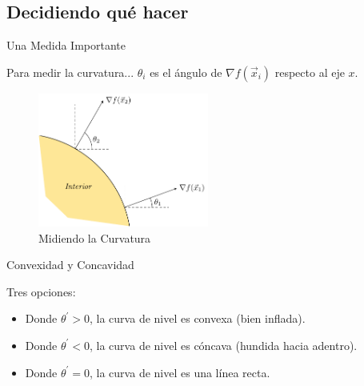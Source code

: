 \documentclass[fleqn]{beamer}\usepackage[]{graphicx}\usepackage[]{xcolor}
\begin{document}
\subsection{Decidiendo qué hacer}

\begin{frame}{Una Medida Importante}
    \begin{block}{Para medir la curvatura...}
        $\theta_i$ es el ángulo de $\nabla f(\vec{x}_i)$ respecto al eje $x$. 
    \end{block}
    \begin{figure}
    \centering
    \includegraphics[width = 0.5\textwidth]{figure31.pdf}
    \caption{Midiendo la Curvatura}
    \label{fig:my_label}
\end{figure}
\end{frame}

\begin{frame}{Convexidad y Concavidad}
    \begin{block}{Tres opciones:}
        \begin{itemize}[<+->]
            \item Donde $\theta^{'} > 0$, la curva de nivel es convexa (bien inflada).
            \item Donde $\theta^{'} < 0$, la curva de nivel es cóncava (hundida hacia adentro).
            \item Donde $\theta^{'} = 0$, la curva de nivel es una línea recta. 
        \end{itemize}
    \end{block}
\end{frame}
\end{document}
